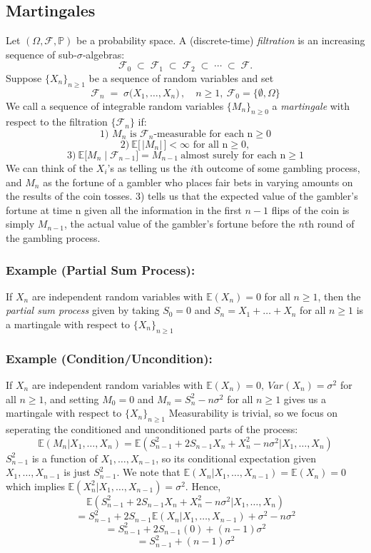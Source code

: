 \documentclass{article}
\begin{document}
\subsection{Martingales}
Let $(\Omega,\mathcal{F},\mathbb{P})$ be a probability space.  A (discrete‐time) \emph{filtration} is an increasing sequence of sub‐$\sigma$‐algebras:
\[
  \mathcal{F}_0 \;\subset\;\mathcal{F}_1\;\subset\;\mathcal{F}_2\;\subset\;\cdots\;\subset\;\mathcal{F}.
\]
Suppose $\{X_n\}_{n\ge1}$ be a sequence of random variables and set
\[
  \mathcal F_n \;=\;\sigma\bigl(X_1,\dots,X_n\bigr)\,,\quad n\ge1, \ \mathcal F_0=\{\emptyset,\Omega\}
\]
We call a sequence of integrable random variables $\{M_n\}_{n\ge0}$ a \emph{martingale} with respect to the filtration $\{\mathcal F_n\}$ if:
\[
\text{1) }M_n \text{ is } \mathcal{F}_n\text{‐measurable for each n}  \ge 0
\]
\[
2)\ \mathbb{E}\bigl[\,|M_n|\,\bigr]<\infty \text{ for all n}\ge0,
\]
\[
3) \ \mathbb{E}\bigl[M_n\mid \mathcal F_{n-1}\bigr]=M_{n-1}\ \text{almost surely for each n}\ge1
\]
We can think of the $X_i$'s as telling us the $i$th outcome of some gambling process, and $M_n$ as the fortune of a gambler who places fair bets in varying amounts on the results of the coin tosses. 3) tells us that the expected value of the gambler's fortune at time n given all the information in the first $n-1$ flips of the coin is simply $M_{n-1}$, the actual value of the gambler's fortune before the $n$th round of the gambling process.
\subsubsection{Example (Partial Sum Process):}
If $X_n$ are independent random variables with $\mathbb{E}(X_n)=0$ for all $n \geq1$, then the \emph{partial sum process} given by taking $S_0=0$ and $S_n=X_1+\ldots+X_n$ for all $n \geq 1$ is a martingale with respect to $\{X_n\}_{n\geq1}$
\subsubsection{Example (Condition/Uncondition):}
If $X_n$ are independent random variables with $\mathbb{E}(X_n)=0, \ Var(X_n)=\sigma^2$ for all $n \geq1$, and setting $M_0=0$ and $M_n=S_n^2-n\sigma^2$ for all $n\geq1$ gives us a martingale with respect to $\{X_n\}_{n\geq1}$ \newline \newline
Measurability is trivial, so we focus on seperating the conditioned and unconditioned parts of the process:
\[
\mathbb{E}(M_n|X_1,\ldots,X_n)=\mathbb{E}(S^2_{n-1}+2S_{n-1}X_n+X_n^2-n\sigma^2|X_1,\ldots,X_n)
\]
$S^2_{n-1}$ is a function of $X_1,\ldots,X_{n-1}$, so its conditional expectation given $X_1,\ldots,X_{n-1}$ is just $S^2_{n-1}$. We note that $\mathbb{E}(X_n|X_1,\ldots,X_{n-1})=\mathbb{E}(X_n)=0$ which implies $\mathbb{E}(X^2_n|X_1,\ldots,X_{n-1})=\sigma^2$. \newline \newline
Hence,
\[
\mathbb{E}(S^2_{n-1}+2S_{n-1}X_n+X_n^2-n\sigma^2|X_1,\ldots,X_n)
\]
\[
=S^2_{n-1}+2S_{n-1}\mathbb{E}(X_n|X_1,\ldots,X_{n-1})+\sigma^2-n\sigma^2
\]
\[
=S^2_{n-1}+2S_{n-1}(0)+(n-1)\sigma^2
\]
\[
=S^2_{n-1}+(n-1)\sigma^2
\]
\end{document}
